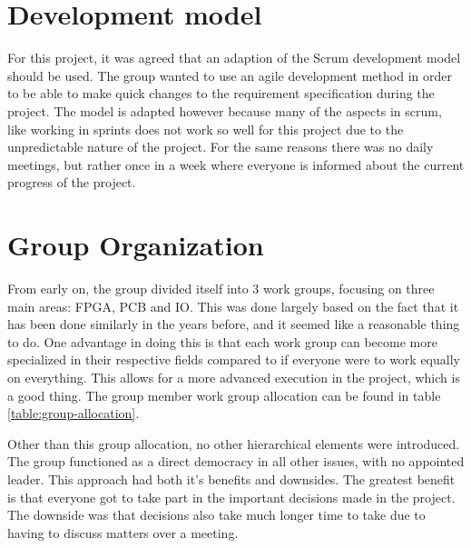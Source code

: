 \section{Development model}
For this project, it was agreed that an adaption of the Scrum development model should be used. The group wanted
to use an agile development method in order to be able to make quick changes to the requirement specification during the project.
The model is adapted however because many of the aspects in scrum, like working in sprints does not work so well for this project due to the unpredictable nature of the project. 
For the same reasons there was no daily meetings, but rather once in a week where everyone is informed about the current progress of the project.
\section{Group Organization}

From early on, the group divided itself into 3 work groups, focusing on three main areas: FPGA, PCB and IO.
This was done largely based on the fact that it has been done similarly in the years before\cite{previous-projects}, and it seemed like a reasonable thing to do.
One advantage in doing this is that each work group can become more specialized in their respective fields compared to if everyone were to work equally on everything.
This allows for a more advanced execution in the project, which is a good thing.
The group member work group allocation can be found in table \vref{table:group-allocation}.

Other than this group allocation, no other hierarchical elements were introduced.
The group functioned as a direct democracy in all other issues, with no appointed leader. This approach had both
it's benefits and downsides. The greatest benefit is that everyone got to take part in the important decisions made in the project.
The downside was that decisions also take much longer time to take due to having to discuss matters over a meeting.


